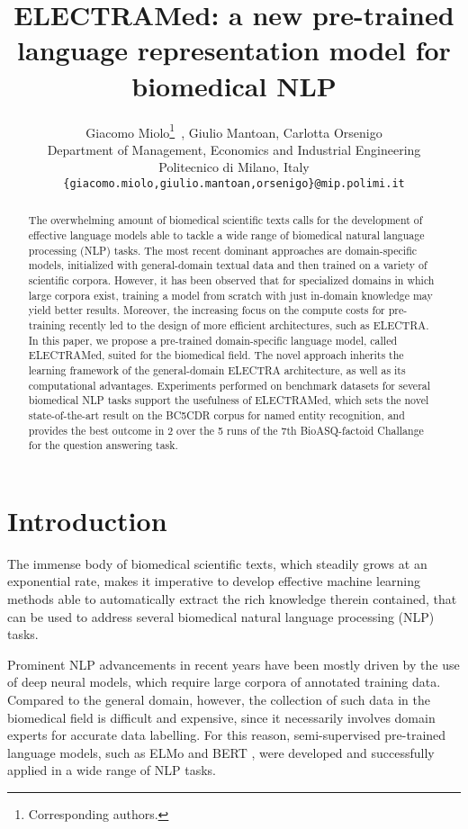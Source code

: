\documentclass{article}
\title{ELECTRAMed: a new pre-trained language representation model for biomedical NLP}
\author{
Giacomo Miolo\thanks{Corresponding authors.}\,\,\,, Giulio Mantoan, Carlotta Orsenigo \\
Department of Management, Economics and Industrial Engineering \\
Politecnico di Milano, Italy \\
\texttt{\{giacomo.miolo,giulio.mantoan,orsenigo\}@mip.polimi.it} \\
}
\begin{document}
\maketitle

\begin{abstract}
The overwhelming amount of biomedical scientific texts calls for the development of effective language models able to tackle a wide range of biomedical natural language processing (NLP) tasks. The most recent dominant approaches are domain-specific models, initialized with general-domain textual data and then trained on a variety of scientific corpora. However, it has been observed that for specialized domains in which large corpora exist, training a model from scratch with just in-domain knowledge may yield better results. Moreover, the increasing focus on the compute costs for pre-training recently led to the design of more efficient architectures, such as ELECTRA. In this paper, we propose a pre-trained domain-specific language model, called ELECTRAMed, suited for the biomedical field. The novel approach inherits the learning framework of the general-domain ELECTRA architecture, as well as its computational advantages. Experiments performed on benchmark datasets for several biomedical NLP tasks support the usefulness of ELECTRAMed, which sets the novel state-of-the-art result on the BC5CDR corpus for named entity recognition, and provides the best outcome in 2 over the 5 runs of the 7th BioASQ-factoid Challange for the question answering task.\\
\end{abstract}




\section{Introduction}
The immense body of biomedical scientific texts, which steadily grows at an exponential rate, makes it imperative to develop effective machine learning methods able to automatically extract the rich knowledge therein contained, that can be used to address several biomedical natural language processing (NLP) tasks.

Prominent NLP advancements in recent years have been mostly driven by the use of deep neural models, which require large corpora of annotated training data. 
Compared to the general domain, however, the collection of such data in the biomedical field is difficult and expensive, since it  necessarily involves domain experts for accurate data labelling.  
For this reason, semi-supervised pre-trained language models, such as ELMo \citep{Peters18} and BERT \citep{Devlin19}, were developed and successfully applied in a wide range of NLP tasks.
\end{document}
